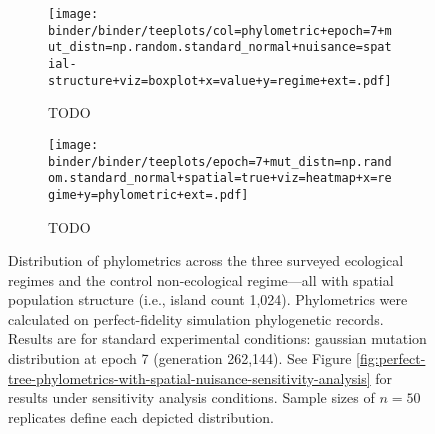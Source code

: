 \begin{figure*}
  \centering
\begin{subfigure}[b]{\textwidth}
  \texttt{[image: binder/binder/teeplots/col=phylometric+epoch=7+mut\_distn=np.random.standard\_normal+nuisance=spatial-structure+viz=boxplot+x=value+y=regime+ext=.pdf]}
  \caption{TODO}
\end{subfigure}
\begin{subfigure}[b]{\textwidth}
  \texttt{[image: binder/binder/teeplots/epoch=7+mut\_distn=np.random.standard\_normal+spatial=true+viz=heatmap+x=regime+y=phylometric+ext=.pdf]}
  \caption{TODO}
\end{subfigure}
  \caption{%
    Distribution of phylometrics across the three surveyed ecological regimes and the control non-ecological regime---all with spatial population structure (i.e., island count 1,024).
    Phylometrics were calculated on perfect-fidelity simulation phylogenetic records.
    Results are for standard experimental conditions: gaussian mutation distribution at epoch 7 (generation 262,144).
    See Figure \ref{fig:perfect-tree-phylometrics-with-spatial-nuisance-sensitivity-analysis} for results under sensitivity analysis conditions.
    Sample sizes of $n=50$ replicates define each depicted distribution.
  }
  \label{fig:perfect-tree-phylometrics-with-spatial-nuisance}
\end{figure*}
